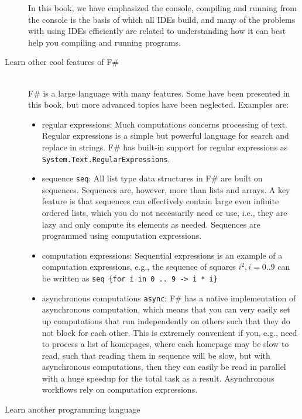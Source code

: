 \begin{description}
  In this book, we have emphasized the console, compiling and running from the console is the basis of which all IDEs build, and many of the problems with using IDEs efficiently are related to understanding how it can best help you compiling and running programs.
\item[Learn other cool features of F\#]~\\
  F\# is a large language with many features. Some have been presented in this book, but more advanced topics have been neglected. Examples are:
  \begin{itemize}
  \item regular expressions: Much computations concerns processing of text. Regular expressions is a simple but powerful language for search and replace in strings. F\# has built-in support for regular expressions as \lstinline{System.Text.RegularExpressions}.
  \item sequence \lstinline{seq}: All list type data structures in F\# are built on sequences. Sequences are, however, more than lists and arrays. A key feature is that sequences can effectively contain large even infinite ordered lists, which you do not necessarily need or use, i.e., they are lazy and only compute its elements as needed. Sequences are programmed using computation expressions.
  \item computation expressions: Sequential expressions is an example of a computation expressions, e.g., the sequence of squares $i^2, i=0..9$ can be written as \lstinline!seq {for i in 0 .. 9 -> i * i}!
  \item asynchronous computations \lstinline{async}: F\# has a native implementation of asynchronous computation, which means that you can very easily set up computations that run independently on others such that they do not block for each other. This is extremely convenient if you, e.g., need to process a list of homepages, where each homepage may be slow to read, such that reading them in sequence will be slow, but with asynchronous computations,  then they can easily be read in parallel with a huge speedup for the total task as a result. Asynchronous workflows rely on computation expressions.
  \end{itemize}
\item[Learn another programming language]~\\

\end{description}
